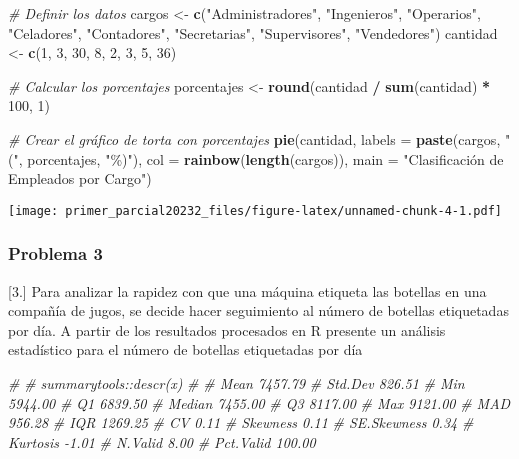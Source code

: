 \documentclass[
]{article}
\newenvironment{Shaded}{\begin{snugshade}}{\end{snugshade}}
\newcommand{\AttributeTok}[1]{\textcolor[rgb]{0.13,0.29,0.53}{#1}}
\newcommand{\CommentTok}[1]{\textcolor[rgb]{0.56,0.35,0.01}{\textit{#1}}}
\newcommand{\DecValTok}[1]{\textcolor[rgb]{0.00,0.00,0.81}{#1}}
\newcommand{\FunctionTok}[1]{\textcolor[rgb]{0.13,0.29,0.53}{\textbf{#1}}}
\newcommand{\NormalTok}[1]{#1}
\newcommand{\OtherTok}[1]{\textcolor[rgb]{0.56,0.35,0.01}{#1}}
\newcommand{\SpecialCharTok}[1]{\textcolor[rgb]{0.81,0.36,0.00}{\textbf{#1}}}
\newcommand{\StringTok}[1]{\textcolor[rgb]{0.31,0.60,0.02}{#1}}
\begin{document}
\begin{Shaded}
\begin{Highlighting}[]
\CommentTok{\# Definir los datos}
\NormalTok{cargos }\OtherTok{\textless{}{-}} \FunctionTok{c}\NormalTok{(}\StringTok{"Administradores"}\NormalTok{, }\StringTok{"Ingenieros"}\NormalTok{, }\StringTok{"Operarios"}\NormalTok{, }\StringTok{"Celadores"}\NormalTok{, }\StringTok{"Contadores"}\NormalTok{, }\StringTok{"Secretarias"}\NormalTok{, }\StringTok{"Supervisores"}\NormalTok{, }\StringTok{"Vendedores"}\NormalTok{)}
\NormalTok{cantidad }\OtherTok{\textless{}{-}} \FunctionTok{c}\NormalTok{(}\DecValTok{1}\NormalTok{, }\DecValTok{3}\NormalTok{, }\DecValTok{30}\NormalTok{, }\DecValTok{8}\NormalTok{, }\DecValTok{2}\NormalTok{, }\DecValTok{3}\NormalTok{, }\DecValTok{5}\NormalTok{, }\DecValTok{36}\NormalTok{)}

\CommentTok{\# Calcular los porcentajes}
\NormalTok{porcentajes }\OtherTok{\textless{}{-}} \FunctionTok{round}\NormalTok{(cantidad }\SpecialCharTok{/} \FunctionTok{sum}\NormalTok{(cantidad) }\SpecialCharTok{*} \DecValTok{100}\NormalTok{, }\DecValTok{1}\NormalTok{)}

\CommentTok{\# Crear el gráfico de torta con porcentajes}
\FunctionTok{pie}\NormalTok{(cantidad, }\AttributeTok{labels =} \FunctionTok{paste}\NormalTok{(cargos, }\StringTok{"("}\NormalTok{, porcentajes, }\StringTok{"\%)"}\NormalTok{), }\AttributeTok{col =} \FunctionTok{rainbow}\NormalTok{(}\FunctionTok{length}\NormalTok{(cargos)), }\AttributeTok{main =} \StringTok{"Clasificación de Empleados por Cargo"}\NormalTok{)}
\end{Highlighting}
\end{Shaded}

\texttt{[image: primer\_parcial20232\_files/figure-latex/unnamed-chunk-4-1.pdf]}

\hypertarget{problema-3}{%
\subsubsection{Problema 3}\label{problema-3}}

{[}3.{]} Para analizar la rapidez con que una máquina etiqueta las
botellas en una compañía de jugos, se decide hacer seguimiento al número
de botellas etiquetadas por día. A partir de los resultados procesados
en R presente un análisis estadístico para el número de botellas
etiquetadas por día

\begin{Shaded}
\begin{Highlighting}[]
\CommentTok{\# }
\CommentTok{\# summarytools::descr(x)  }
\CommentTok{\# }
\CommentTok{\# Mean      7457.79}
\CommentTok{\# Std.Dev    826.51}
\CommentTok{\# Min       5944.00}
\CommentTok{\# Q1        6839.50}
\CommentTok{\# Median    7455.00}
\CommentTok{\# Q3        8117.00}
\CommentTok{\# Max       9121.00}
\CommentTok{\# MAD        956.28}
\CommentTok{\# IQR       1269.25}
\CommentTok{\# CV           0.11}
\CommentTok{\# Skewness     0.11}
\CommentTok{\# SE.Skewness  0.34}
\CommentTok{\# Kurtosis    {-}1.01}
\CommentTok{\# N.Valid      8.00}
\CommentTok{\# Pct.Valid  100.00}
\end{Highlighting}
\end{Shaded}
\end{document}
